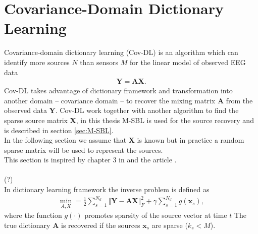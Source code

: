 \section{Covariance-Domain Dictionary Learning}\label{sec:Cov-DL}
Covariance-domain dictionary learning (Cov-DL) is an algorithm which can identify more sources $N$ than sensors $M$ for the linear model of observed EEG data
\begin{align*}
\mathbf{Y} = \mathbf{AX}.
\end{align*}
Cov-DL takes advantage of dictionary framework and transformation into another domain -- covariance domain -- to recover the mixing matrix $\mathbf{A}$ from the observed data $\mathbf{Y}$. Cov-DL work together with another algorithm to find the sparse source matrix $\mathbf{X}$, in this thesis M-SBL is used for the source recovery and is described in section \ref{sec:M-SBL}. 
\\
In the following section we assume that $\mathbf{X}$ is known but in practice a random sparse matrix will be used to represent the sources. 
\\
This section is inspired by chapter 3 in \cite{phd2015} and the article \cite{Balkan2015}.
\\ \\
(?)\\
In dictionary learning framework the inverse problem is defined as
\begin{align*}
\min_{A,X} = \frac{1}{2} \sum_{s=1}^{N_d} \Vert \mathbf{Y} - \mathbf{AX} \Vert_F^2 + \gamma \sum_{s=1}^{N_d} g(\mathbf{x}_s),
\end{align*}
where the function $g(\cdot)$ promotes sparsity of the source vector at time $t$ 
The true dictionary $\mathbf{A}$ is recovered if the sources $\mathbf{x}_s$ are sparse ($k_s < M$).


